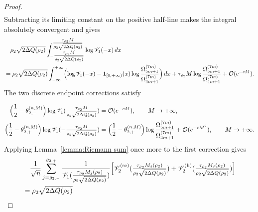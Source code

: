\documentclass[a4paper]{article}
\numberwithin{equation}{section}
\begin{document}
\begin{proof}
\begin{align*}
\end{align*}
Subtracting its limiting constant on the positive half-line makes the integral
absolutely convergent and gives
\begin{align*}
&\quad\rho_2\sqrt{2\Delta Q(\rho_2)}
\int_{-\tfrac{\tau_{\rho_2}M}{\rho_2\sqrt{2\Delta Q(\rho_2)}}}^{\tfrac{\tau_{\rho_2}M}{\rho_2\sqrt{2\Delta Q(\rho_2)}}}
\log \mathscr{V}_1(-x)\,dx
\\
&=
\rho_2\sqrt{2\Delta Q(\rho_2)}
\int_{-\infty}^{+\infty}
\Bigl(\log \mathscr{V}_1( -x)
-\mathbf{1}_{[0,+\infty)}(x)\log\frac{\Omega_{5m+1}^{(7m)}}{\Omega_{4m+1}^{(7m)}}\Bigr)\,dx
+\tau_{\rho_2}M\log\frac{\Omega_{5m+1}^{(7m)}}{\Omega_{4m+1}^{(7m)}}
+\mathcal O(e^{-cM}).
\end{align*}
The two discrete endpoint corrections satisfy

\begin{align*}
\Bigl(\frac{1}{2}-\theta_{2,-}^{(n,M)}\Bigr)\log \mathscr{V}_1(\tfrac{\tau_{\rho_2}M}{\rho_2\sqrt{2\Delta Q(\rho_2)}})
&=
\mathcal{O}(e^{-cM}),\qquad M\to+\infty,
\\
\Bigl(\frac{1}{2}-\theta_{2,+}^{(n,M)}\Bigr)\log \mathscr{V}_1(-\tfrac{\tau_{\rho_2}M}{\rho_2\sqrt{2\Delta Q(\rho_2)}})   
&=
\Bigl(\frac{1}{2}-\theta_{2,+}^{(n,M)}\Bigr)\log \frac{\Omega_{5m+1}^{(7m)}}{\Omega_{4m+1}^{(7m)}}+\mathcal{O}(e^{-cM^2}),\qquad
M\to+\infty.
\end{align*}
Applying Lemma~\ref{lemma:Riemann sum} once more to the first correction gives
\begin{align*}
&\quad
\frac{1}{\sqrt{n}}\sum_{j=g_{2,-}}^{g_{2,+}}
\frac{1}{\mathscr{V}_1(\tfrac{\tau_{\rho_2}M_j(\rho_2)}{\rho_2\sqrt{2\Delta Q(\rho_2)}})}\Bigl[
\mathscr{V}_2^{(\mathrm{se})}(\tfrac{\tau_{\rho_2}M_j(\rho_2)}{\rho_2\sqrt{2\Delta Q(\rho_2)}})+\mathscr{V}_2^{(\mathrm{h})}(\tfrac{\tau_{\rho_2}M_j(\rho_2)}{\rho_2\sqrt{2\Delta Q(\rho_2)}})
\Bigr]
\\
&=
\rho_2\sqrt{2\Delta Q(\rho_2)}

\end{align*}
\end{proof}
\end{document}
